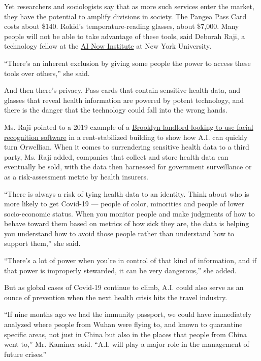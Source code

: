 Yet researchers and sociologists say that as more such services enter
the market, they have the potential to amplify divisions in society. The
Pangea Pass Card costs about \$140. Rokid's temperature-reading glasses,
about \$7,000. Many people will not be able to take advantage of these
tools, said Deborah Raji, a technology fellow at the
\href{https://ainowinstitute.org/}{AI Now Institute} at New York
University.

``There's an inherent exclusion by giving some people the power to
access these tools over others,'' she said.

And then there's privacy. Pass cards that contain sensitive health data,
and glasses that reveal health information are powered by potent
technology, and there is the danger that the technology could fall into
the wrong hands.

Ms. Raji pointed to a 2019 example of a
\href{https://www.nytimes3xbfgragh.onion/2019/03/28/nyregion/rent-stabilized-buildings-facial-recognition.html}{Brooklyn
landlord looking to use facial recognition software} in a
rent-stabilized building to show how A.I. can quickly turn Orwellian.
When it comes to surrendering sensitive health data to a third party,
Ms. Raji added, companies that collect and store health data can
eventually be sold, with the data then harnessed for government
surveillance or as a risk-assessment metric by health insurers.

``There is always a risk of tying health data to an identity. Think
about who is more likely to get Covid-19 --- people of color, minorities
and people of lower socio-economic status. When you monitor people and
make judgments of how to behave toward them based on metrics of how sick
they are, the data is helping you understand how to avoid those people
rather than understand how to support them,'' she said.

``There's a lot of power when you're in control of that kind of
information, and if that power is improperly stewarded, it can be very
dangerous,'' she added.

But as global cases of Covid-19 continue to climb, A.I. could also serve
as an ounce of prevention when the next health crisis hits the travel
industry.

``If nine months ago we had the immunity passport, we could have
immediately analyzed where people from Wuhan were flying to, and known
to quarantine specific areas, not just in China but also in the places
that people from China went to,'' Mr. Kaminer said. ``A.I. will play a
major role in the management of future crises.''

